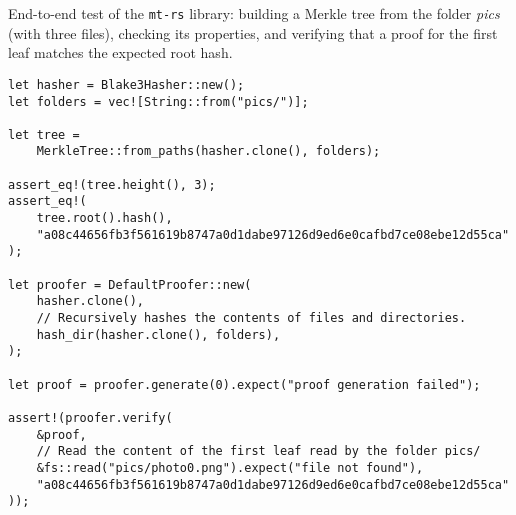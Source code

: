 \begin{listing}[!htb]
\caption{End-to-end test of the \texttt{mt-rs} library: building a Merkle tree from the folder \emph{pics} (with three files), checking its properties, and verifying that a proof for the first leaf matches the expected root hash.}

\label{code:mt-example}
\begin{verbatim}
let hasher = Blake3Hasher::new();
let folders = vec![String::from("pics/")];

let tree = 
    MerkleTree::from_paths(hasher.clone(), folders);

assert_eq!(tree.height(), 3);
assert_eq!(
    tree.root().hash(),
    "a08c44656fb3f561619b8747a0d1dabe97126d9ed6e0cafbd7ce08ebe12d55ca"
);

let proofer = DefaultProofer::new(
    hasher.clone(), 
    // Recursively hashes the contents of files and directories.
    hash_dir(hasher.clone(), folders), 
);

let proof = proofer.generate(0).expect("proof generation failed");

assert!(proofer.verify(
    &proof,
    // Read the content of the first leaf read by the folder pics/
    &fs::read("pics/photo0.png").expect("file not found"),
    "a08c44656fb3f561619b8747a0d1dabe97126d9ed6e0cafbd7ce08ebe12d55ca"
));
\end{verbatim}
\end{listing}
